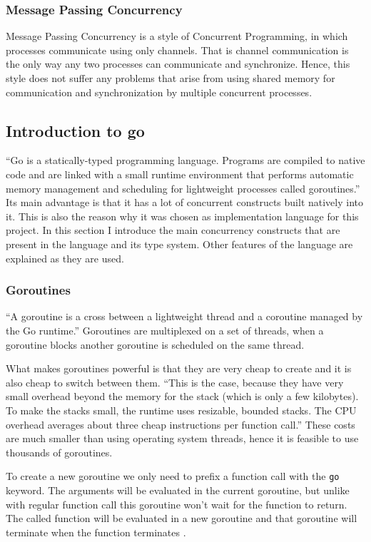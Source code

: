 \documentclass[12pt,a4paper]{article}
\begin{document}
\subsubsection{Message Passing Concurrency}
Message Passing Concurrency is a style of Concurrent Programming, in which
processes communicate using only channels. That is channel communication is 
the only way any two processes can communicate and synchronize. 
Hence, this style does not 
suffer any problems that arise from using shared memory for communication 
and synchronization by multiple concurrent processes.

\subsection{Introduction to go}
``Go is a statically-typed programming language. Programs are compiled 
to native code and are linked with a small runtime environment that performs 
automatic memory management and scheduling for lightweight processes called 
goroutines.'' \cite[2]{whitehead} Its main advantage is 
that it has a lot of concurrent constructs built natively into it.
This is also the reason why it was chosen as implementation language 
for this project.
In this section I introduce the main concurrency constructs that are
present in the language and its type system. Other features
of the language are explained as they are used.

\subsubsection{Goroutines}
``A goroutine is a cross between a lightweight thread and a coroutine
managed by the Go runtime.'' \cite[2]{whitehead} Goroutines are multiplexed
on a set of threads, when a goroutine blocks another goroutine is scheduled
on the same thread. 

What makes goroutines powerful is that they are very cheap to create and 
it is also cheap to switch between them. ``This is the case, because they 
have very small overhead beyond the memory for the stack (which is only 
a few kilobytes). To make the stacks small, the runtime uses resizable, 
bounded stacks. The CPU overhead averages about three cheap 
instructions per function call.'' \cite{FAQ} These costs are much smaller
than using operating system threads, hence it is feasible to use thousands
of goroutines.

To create a new goroutine we only need to prefix a function call with
the \texttt{go} keyword. The arguments will be evaluated in the current
goroutine, but unlike with regular function call this goroutine won't
wait for the function to return. The called 
function will be evaluated in a new goroutine and that goroutine will 
terminate when the function terminates \cite{GoDocumentation}.
\end{document}
